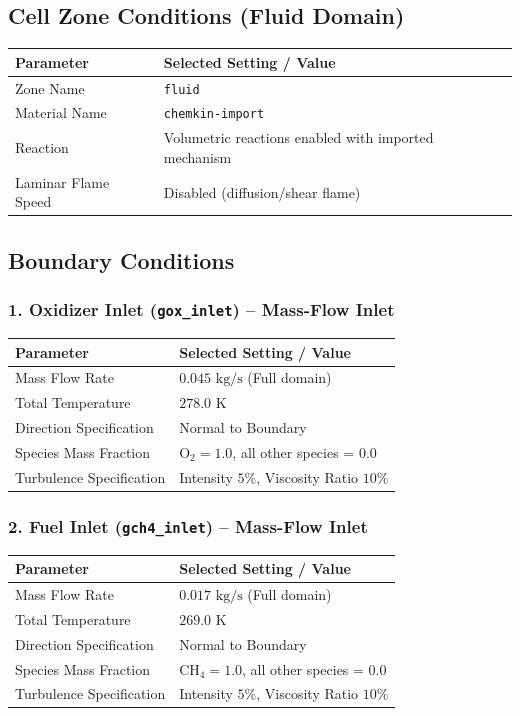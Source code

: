 \documentclass[11pt,a4paper]{article}
\begin{document}
\subsection{Cell Zone Conditions (Fluid Domain)}
\begin{tabularx}{\textwidth}{L{4.5cm} Y}
\toprule
\textbf{Parameter} & \textbf{Selected Setting / Value} \\
\midrule
Zone Name & \texttt{fluid} \\
Material Name & \texttt{chemkin-import} \\
Reaction & Volumetric reactions enabled with imported mechanism \\
Laminar Flame Speed & Disabled (diffusion/shear flame) \\
\bottomrule
\end{tabularx}

\subsection{Boundary Conditions}

\subsubsection*{1. Oxidizer Inlet (\texttt{gox\_inlet}) -- Mass-Flow Inlet}

\begin{tabularx}{\textwidth}{L{4.5cm} Y}
\toprule
\textbf{Parameter} & \textbf{Selected Setting / Value} \\
\midrule
Mass Flow Rate & $0.045\text{ kg/s}$ (Full domain) \\
Total Temperature & $278.0\text{ K}$ \\
Direction Specification & Normal to Boundary \\
Species Mass Fraction & $\text{O}_2 = 1.0$, all other species = $0.0$ \\
Turbulence Specification & Intensity $5\%$, Viscosity Ratio $10 \%$ \\
\bottomrule
\end{tabularx}

\subsubsection*{2. Fuel Inlet (\texttt{gch4\_inlet}) -- Mass-Flow Inlet}

\begin{tabularx}{\textwidth}{L{4.5cm} Y}
\toprule
\textbf{Parameter} & \textbf{Selected Setting / Value} \\
\midrule
Mass Flow Rate & $0.017\text{ kg/s}$ (Full domain) \\
Total Temperature & $269.0\text{ K}$ \\
Direction Specification & Normal to Boundary \\
Species Mass Fraction & $\text{CH}_4 = 1.0$, all other species = $0.0$ \\
Turbulence Specification & Intensity $5\%$, Viscosity Ratio $10 \%$ \\
\bottomrule
\end{tabularx}
\end{document}
